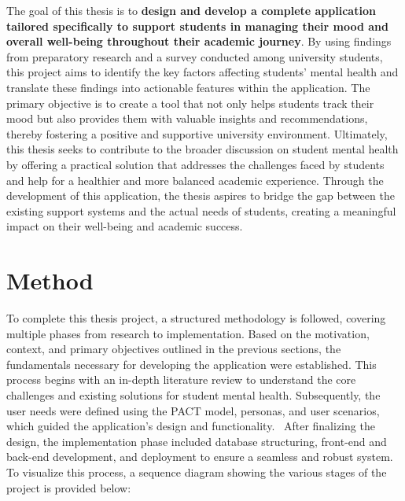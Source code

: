 The goal of this thesis is to \textbf{design and develop a complete application tailored specifically to support students in managing their mood and overall well-being throughout their academic journey}. By using findings from preparatory research and a survey conducted among university students, this project aims to identify the key factors affecting students' mental health and translate these findings into actionable features within the application. The primary objective is to create a tool that not only helps students track their mood but also provides them with valuable insights and recommendations, thereby fostering a positive and supportive university environment. Ultimately, this thesis seeks to contribute to the broader discussion on student mental health by offering a practical solution that addresses the challenges faced by students and help for a healthier and more balanced academic experience. Through the development of this application, the thesis aspires to bridge the gap between the existing support systems and the actual needs of students, creating a meaningful impact on their well-being and academic success.

\section{Method}

To complete this thesis project, a structured methodology is followed, covering multiple phases from research to implementation. Based on the motivation, context, and primary objectives outlined in the previous sections, the fundamentals necessary for developing the application were established. This process begins with an in-depth literature review to understand the core challenges and existing solutions for student mental health. Subsequently, the user needs were defined using the PACT model, personas, and user scenarios, which guided the application’s design and functionality.\vspace{2mm} \ After finalizing the design, the implementation phase included database structuring, front-end and back-end development, and deployment to ensure a seamless and robust system. To visualize this process, a sequence diagram showing the various stages of the project is provided below:

\vspace{5mm}

